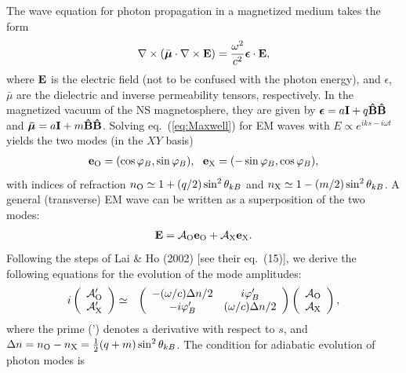 \documentclass[useAMS,onecolumn,usenatbib,usegraphicx]{mn2e}
\begin{document}
The wave equation for photon propagation in a magnetized medium takes
the form
\begin{eqnarray}
\label{eq:Maxwell}
\nabla\times (\bar{\mbox{\boldmath $\mu$}}\cdot\nabla\times{\bf E}) =
{\omega^2\over c^2}\mbox{\boldmath $\epsilon$}\cdot{\bf E},
\end{eqnarray}
where ${\bf E}$ is the electric field (not to be confused with the
photon energy), and {\boldmath $\epsilon$}, {\boldmath $\bar\mu$} are 
the dielectric and inverse permeability tensors, respectively.
In the magnetized vacuum of the NS magnetosphere, they are given by 
$\mbox{\boldmath $\epsilon$} =a{\bf I}+q{\bf\hat{B}}{\bf\hat{B}}$ and
$\mbox{\boldmath $\bar{\mu}$} =a{\bf I}+m{\bf\hat{B}}{\bf\hat{B}}$.
Solving eq.~(\ref{eq:Maxwell}) for EM waves with $E\propto e^{iks-i\omega t}$ 
yields the two modes (in the $XY$ basis)
\begin{eqnarray}
\label{eq:PolarModes}
{\bf e}_{\rm O}= (\cos\varphi_B,\sin\varphi_B),\ \ {\bf e}_{\rm X} =
(-\sin\varphi_B,\cos\varphi_B),
\end{eqnarray}
with indices of refraction $n_{\rm O} \simeq 1+(q/2)\sin^2\theta_{kB}$
and $n_{\rm X} \simeq 1-(m/2)\sin^2\theta_{kB}$. A general (transverse) EM
wave can be written as a superposition of the two modes:
\begin{eqnarray}
\label{eq:GenEM}
{\bf E} = {\cal A}_{\rm O} {\bf e_{\rm O}} + {\cal A}_{\rm X} {\bf e_{\rm X}}.
\end{eqnarray}
Following the steps of Lai \& Ho (2002) [see their eq.~(15)],
we derive the following equations for the evolution of the mode amplitudes:
\begin{eqnarray}
\label{eq:AmpEvol}
i \left(
\begin{array}{c}
{\cal A}_{\rm O}'\\
{\cal A}_{\rm X}'
\end{array}
\right)
& \simeq &
\left(
\begin{array}{cc}
-(\omega/c)\Delta n/2 & i\varphi_B'\\
-i\varphi_B' & (\omega/c)\Delta n/2
\end{array}
\right)
\left(
\begin{array}{c}
{\cal A}_{\rm O}\\
{\cal A}_{\rm X}
\end{array}
\right),
\end{eqnarray}
where the prime (') denotes a derivative with respect to $s$, and
$\Delta n=n_{\rm O}-n_{\rm X}={1\over 2}(q+m)\sin^2\theta_{kB}$.
The condition for adiabatic evolution of photon modes is 
\end{document}
